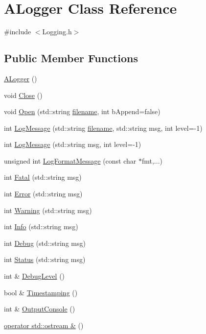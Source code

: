 \hypertarget{classALogger}{\section{A\-Logger Class Reference}
\label{classALogger}
}


{\ttfamily \#include $<$Logging.\-h$>$}

\subsection*{Public Member Functions}
\begin{DoxyCompactItemize}
\item 
\hyperlink{classALogger_a58faf4ee6703c1579d67abd6bf349666}{A\-Logger} ()
\item 
void \hyperlink{classALogger_a21af98bd1c9fdbde4098d2b242cb9ea9}{Close} ()
\item 
void \hyperlink{classALogger_aecec26cddee0a644ae8ac096b2c016ca}{Open} (std\-::string \hyperlink{classALogger_a963caefa4b53d7fc416744c0150257af}{filename}, int b\-Append=false)
\item 
int \hyperlink{classALogger_a55589cb378e3623a35c6057613b818a3}{Log\-Message} (std\-::string \hyperlink{classALogger_a963caefa4b53d7fc416744c0150257af}{filename}, std\-::string msg, int level=-\/1)
\item 
int \hyperlink{classALogger_a791e035a97c7d5f4ea809288290d43ec}{Log\-Message} (std\-::string msg, int level=-\/1)
\item 
unsigned int \hyperlink{classALogger_a551f07b441d91d7f4cad8b9b87fa66ed}{Log\-Format\-Message} (const char $\ast$fmt,...)
\item 
int \hyperlink{classALogger_a040e23b0907c20b1bc33ad438eeae387}{Fatal} (std\-::string msg)
\item 
int \hyperlink{classALogger_a6a5eae7afd2d2ecb285094695ef7412e}{Error} (std\-::string msg)
\item 
int \hyperlink{classALogger_a222284c08bb2192d0ec9d1746fe248dc}{Warning} (std\-::string msg)
\item 
int \hyperlink{classALogger_a9b3186e34f76917f8eed4f789f160f8d}{Info} (std\-::string msg)
\item 
int \hyperlink{classALogger_a5f55d3c517fd61412af827229fdc1bf7}{Debug} (std\-::string msg)
\item 
int \hyperlink{classALogger_af08cbc4a4e317bfe9907baa3aceb8485}{Status} (std\-::string msg)
\item 
int \& \hyperlink{classALogger_a1c9a40f9a8b0067adbb5fc795e3bd5b5}{Debug\-Level} ()
\item 
bool \& \hyperlink{classALogger_acabf9035c4ee58fbe49b251bfc245650}{Timestamping} ()
\item 
int \& \hyperlink{classALogger_aff003fac697a2418e34d9edee7cb2d3d}{Output\-Console} ()
\item 
\hyperlink{classALogger_a48c1c2a99a7d0926316740f70e0efff7}{operator std\-::ostream \&} ()
\end{DoxyCompactItemize}
